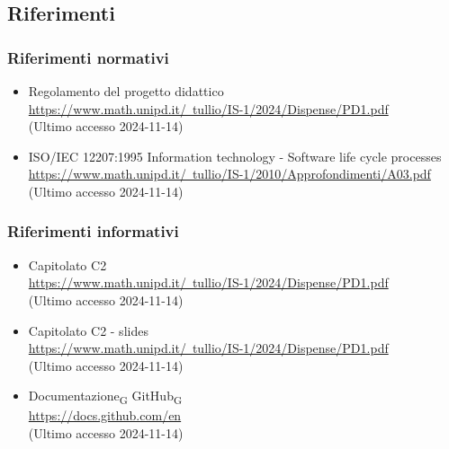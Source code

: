 \subsection{Riferimenti}
\subsubsection{Riferimenti normativi}
\begin{itemize}
    \item Regolamento del progetto didattico\\ \href{https://www.math.unipd.it/~tullio/IS-1/2024/Dispense/PD1.pdf}{https://www.math.unipd.it/~tullio/IS-1/2024/Dispense/PD1.pdf} \\ (Ultimo accesso 2024-11-14)
    \item ISO/IEC 12207:1995 Information technology - Software life cycle processes \\ \href{https://www.math.unipd.it/~tullio/IS-1/2010/Approfondimenti/A03.pdf}{https://www.math.unipd.it/~tullio/IS-1/2010/Approfondimenti/A03.pdf}\\ (Ultimo accesso 2024-11-14)

\end{itemize}

\subsubsection{Riferimenti informativi}
\begin{itemize}
    \item Capitolato C2 \\ \href{https://www.math.unipd.it/~tullio/IS-1/2024/Dispense/PD1.pdf}{https://www.math.unipd.it/~tullio/IS-1/2024/Dispense/PD1.pdf}\\ (Ultimo accesso 2024-11-14)
    \item Capitolato C2 - slides \\ \href{https://www.math.unipd.it/~tullio/IS-1/2024/Dispense/PD1.pdf}{https://www.math.unipd.it/~tullio/IS-1/2024/Dispense/PD1.pdf}\\ (Ultimo accesso 2024-11-14)
    \item Documentazione\textsubscript{G} GitHub\textsubscript{G} \\ \href{https://docs.github.com/en}{https://docs.github.com/en}\\ (Ultimo accesso 2024-11-14)
    
\end{itemize}